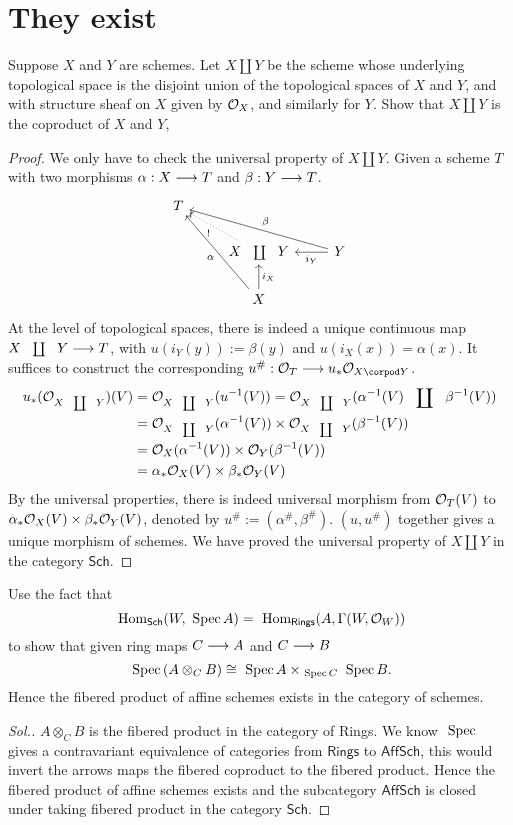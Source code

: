 \documentclass[11pt]{book} %
\begin{document}
\section{They exist}
\begin{exr}
Suppose $X$ and $Y$ are schemes. Let $X\coprod Y$ be the scheme whose underlying topological space is the disjoint union of the topological spaces of $X$ and $Y$, and with structure sheaf on $X$ given by ${\cal O}_X$, and similarly for $Y$. Show that $X\coprod Y$ is the coproduct of $X$ and $Y$,
\end{exr}
\begin{proof}
We only have to check the universal property of $X\coprod Y$.
 Given a scheme $T$ with two morphisms $\alpha: X\longrightarrow T$ and $\beta: Y\longrightarrow T$.
 $$
\begin{tikzcd}
T &  &  \\
 & X\coprod Y \arrow[lu, "!", dotted] & Y \arrow[l, "i_Y"] \arrow[llu, "\beta"'] \\
 & X \arrow[u, "i_X"'] \arrow[luu, "\alpha"] & 
\end{tikzcd}
 $$
 At the level of topological spaces, there is indeed a unique continuous map $X\coprod Y\lrta T$, with $u(i_Y(y)):=\beta(y)$ and $u(i_X(x))=\alpha(x)$. It suffices to construct the corresponding $u^\#:\calo_T\lrta u_*\calo_{X\corpod Y}$. 
 $$
 \begin{aligned}
 u_*(\calo_{X\coprod Y})(V)
 &=\calo_{X\coprod Y}(u^{-1}(V))=\calo_{X\coprod Y}(\alpha^{-1}(V)\coprod\beta^{-1}(V))\\
 &=\calo_{X\coprod Y}(\alpha^{-1}(V))\times\calo_{X\coprod Y}(\beta^{-1}(V))\\
 &=\calo_X(\alpha^{-1}(V))\times\calo_Y(\beta^{-1}(V))\\
 &=\alpha_*\calo_{X}(V)\times \beta_*\calo_{Y}(V) 
 \end{aligned}
 $$  
 By the universal properties, there is indeed universal morphism from ${\cal O}_T(V)$ to $\alpha_*{\cal O}_{X}(V)\times \beta_*{\cal O}_{Y}(V)$, denoted by $u^\#:=(\alpha^\#,\beta^\#)$. $(u,u^\#)$ together gives a unique morphism of schemes.
We have proved the universal property of $X\coprod Y$ in the category $\mathsf{Sch}$.
\end{proof}
\begin{exr}
Use the fact that
$$
\text{ Hom}_{\mathsf{Sch}}(W,\text{ Spec\,} A)=\text{ Hom}_{\mathsf{Rings}}(A,\Gamma(W,{\cal O}_W)) 
$$
to show that given ring maps $C\longrightarrow A$ and $C\longrightarrow B$
$$
\text{ Spec\,} (A\otimes_C B)\cong \text{ Spec\,} A\times_{\text{ Spec\,} C}\text{ Spec\,} B.
$$
Hence the fibered product of affine schemes exists in the category of schemes.
\end{exr}
\begin{proof}[Sol.]
$A\otimes_C B$ is the fibered product in the category of Rings. We know $\text{ Spec\,}$ gives a contravariant equivalence of categories from $\mathsf{Rings}$ to $\mathsf{AffSch}$, this would invert the arrows maps the fibered coproduct to the fibered product.
Hence the fibered product of affine schemes exists and the subcategory $\mathsf{AffSch}$ is closed under taking fibered product in the category $\mathsf{Sch}$.
\end{proof}
\end{document}

